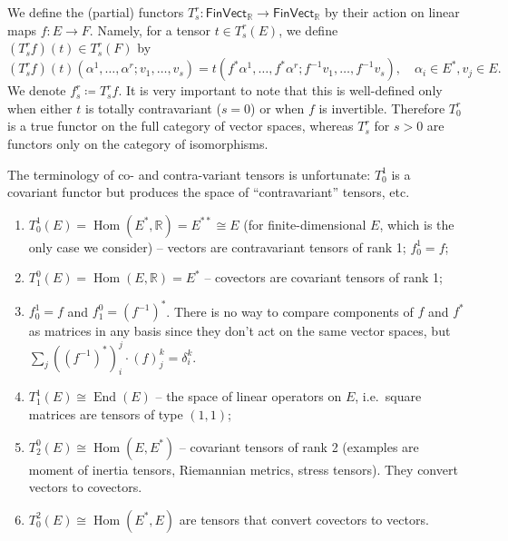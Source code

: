 \documentclass[english,letterpaper]{article}%
\numberwithin{equation}{section}
\numberwithin{figure}{section}
\numberwithin{table}{section}
\theoremstyle{definition}
\theoremstyle{definition}
\theoremstyle{definition}
\theoremstyle{plain}
\theoremstyle{plain}
\theoremstyle{plain}
\theoremstyle{plain}
\theoremstyle{remark}
\theoremstyle{remark}
\DeclareMathOperator{\End}{End}
\DeclareMathOperator{\Hom}{Hom}
\begin{document}
\begin{defn}
    We define the (partial) functors $T^r_s:\mathsf{FinVect_\mathbb{R}}\to\mathsf{FinVect}_\mathbb{R}$ by their action on linear maps $f:E\to F$. Namely, for a tensor $t\in T^r_s(E)$, we define $(T^r_sf)(t)\in T^r_s(F)$ by
    \[
    (T^r_sf)(t)(\alpha^1,\ldots,\alpha^r;v_1,\ldots,v_s)=t(f^\ast\alpha^1,\ldots,f^\ast\alpha^r;f^{-1}v_1,\ldots,f^{-1}v_s), \quad \alpha_i\in E^\ast,v_j\in E.
    \]
    We denote $f^r_s\coloneqq T^r_s f$. It is very important to note that this is well-defined only when either $t$ is totally contravariant ($s=0$) or when $f$ is invertible. Therefore $T^r_0$ is a true functor on the full category of vector spaces, whereas $T^r_s$ for $s>0$ are functors only on the category of isomorphisms.
\end{defn}


\begin{rem}
    The terminology of co- and contra-variant tensors is unfortunate: $T_0^1$ is a covariant functor but produces the space of ``contravariant'' tensors, etc.
\end{rem}

\begin{example}
\begin{enumerate}
    \item $T_0^1(E)=\Hom(E^\ast,\mathbb{R})=E^{\ast\ast}\cong E$ (for finite-dimensional $E$, which is the only case we consider) -- vectors are contravariant tensors of rank 1; $f^1_0=f$;
    \item $T_1^0(E)=\Hom(E,\mathbb{R})=E^\ast$ -- covectors are covariant tensors of rank 1;
    \item $f^1_0=f$ and $f^0_1=\left(f^{-1}\right)^\ast$. There is no way to compare components of $f$ and $f^\ast$ as matrices in any basis since they don't act on the same vector spaces, but $\sum_j \left(\left(f^{-1}\right)^\ast\right)_i^j \cdot (f)_j^k=\delta_i^k$.
    \item $T^1_1(E)\cong \End(E)$ -- the space of linear operators on $E$, i.e.\ square matrices are tensors of type $(1,1)$;
    \item $T^0_2(E)\cong\Hom(E,E^\ast)$ -- covariant tensors of rank 2 (examples are moment of inertia tensors, Riemannian metrics, stress tensors). They convert vectors to covectors.
    \item $T^2_0(E)\cong\Hom(E^\ast ,E)$ are tensors that convert covectors to vectors.
\end{enumerate}
\end{example}
\end{document}
